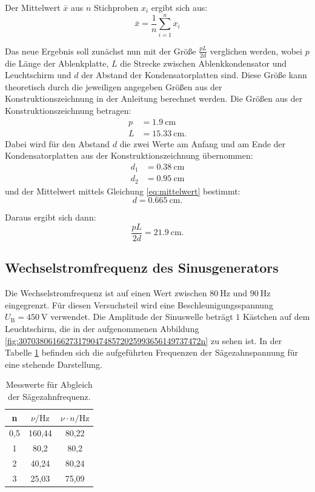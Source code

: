 Der Mittelwert $\bar{x}$ aus $n$ Stichproben $x_{i}$ ergibt sich aus:
\newline
\begin{equation}
\bar{x}=\frac{1}{n}\sum \limits_{i=1}^n x_{i}
\label{eq:mittelwert}
\end{equation}

Das neue Ergebnis soll zunächst nun mit der Größe $\frac{pL}{2d}$ verglichen werden, wobei $p$ die Länge der Ablenkplatte, $L$ die Strecke zwischen Ablenkkondensator und Leuchtschirm und $d$ der Abstand der Kondensatorplatten sind. Diese Größe kann theoretisch durch die jeweiligen angegeben Größen aus der Konstruktionszeichnung in der Anleitung \cite[7]{anleitung501} berechnet werden. 
Die Größen aus der Konstruktionszeichnung betragen:
\begin{align*}
p &= \SI{1,9}{\cm} \\
L &= \SI{15,33}{\cm}.
\end{align*}
Dabei wird für den Abstand $d$ die zwei Werte am Anfang und am Ende der Kondensatorplatten aus der Konstruktionszeichnung übernommen:
\begin{align*}
d_1 &= \SI{0,38}{\cm} \\
d_2 &= \SI{0,95}{\cm}
\end{align*}
und der Mittelwert mittels Gleichung \ref{eq:mittelwert} bestimmt:
\begin{equation*}
d = \SI{0,665}{\cm}.
\end{equation*}

Daraus ergibt sich dann:
\begin{equation*}
\frac{pL}{2d} = \SI{21,9}{\cm}.
\end{equation*}

\subsection{Wechselstromfrequenz des Sinusgenerators}
Die Wechselstromfrequenz ist auf einen Wert zwischen $\SI{80}{\Hz}$ und $\SI{90}{\Hz}$ eingegrenzt. Für diesen Versuchsteil wird eine Beschleunigungsspannung $U_\text{B} = \SI{450}{\volt}$ verwendet. Die Amplitude der Sinuswelle beträgt $1$ Kästchen auf dem Leuchtschirm, die in der aufgenommenen Abbildung \ref{fig:3070380616627317904748572025993656149737472n} zu sehen ist. 
In der Tabelle \ref{tab:Sägezahnfreq} befinden sich die aufgeführten Frequenzen der Sägezahnspannung für eine stehende Darstellung. 

\begin{table}[htbp]
	\centering
	\caption{Messwerte für Abgleich der Sägezahnfrequenz.}
	\label{tab:Sägezahnfreq}
	\begin{tabular}{c c c}
		\toprule
	    n & $\nu / \si{\Hz}$ & $\nu \cdot n / \si{\Hz}$ \\
		\midrule
		0,5 & 160,44 & 80,22 \\
		1 & 80,2 & 80,2 \\
		2 & 40,24 & 80,24 \\
		3 & 25,03 & 75,09 \\
		\bottomrule
	\end{tabular}
\end{table}

